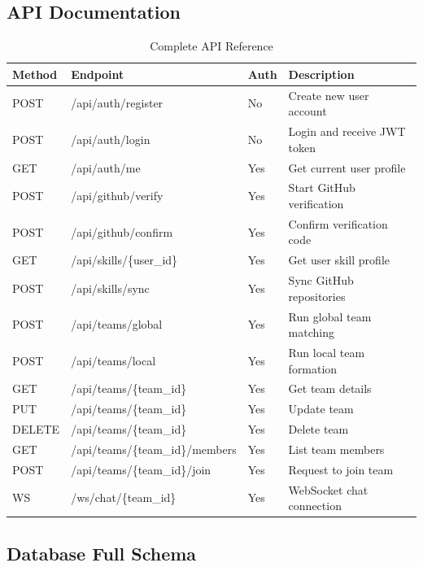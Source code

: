 \documentclass[12pt,a4paper]{article}
\begin{document}
\subsection{API Documentation}

\begin{table}[H]
\centering
\caption{Complete API Reference}
\label{tab:api}
\begin{tabular}{|l|l|l|l|}
\hline
\textbf{Method} & \textbf{Endpoint} & \textbf{Auth} & \textbf{Description} \\ \hline
POST & /api/auth/register & No & Create new user account \\ \hline
POST & /api/auth/login & No & Login and receive JWT token \\ \hline
GET & /api/auth/me & Yes & Get current user profile \\ \hline
POST & /api/github/verify & Yes & Start GitHub verification \\ \hline
POST & /api/github/confirm & Yes & Confirm verification code \\ \hline
GET & /api/skills/\{user\_id\} & Yes & Get user skill profile \\ \hline
POST & /api/skills/sync & Yes & Sync GitHub repositories \\ \hline
POST & /api/teams/global & Yes & Run global team matching \\ \hline
POST & /api/teams/local & Yes & Run local team formation \\ \hline
GET & /api/teams/\{team\_id\} & Yes & Get team details \\ \hline
PUT & /api/teams/\{team\_id\} & Yes & Update team \\ \hline
DELETE & /api/teams/\{team\_id\} & Yes & Delete team \\ \hline
GET & /api/teams/\{team\_id\}/members & Yes & List team members \\ \hline
POST & /api/teams/\{team\_id\}/join & Yes & Request to join team \\ \hline
WS & /ws/chat/\{team\_id\} & Yes & WebSocket chat connection \\ \hline
\end{tabular}
\end{table}

\subsection{Database Full Schema}
\end{document}
